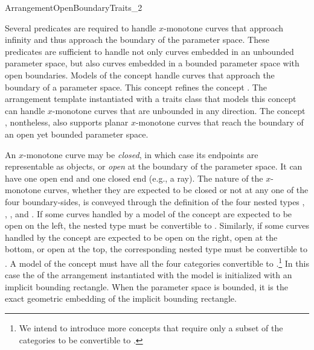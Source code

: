 
\ccRefPageBegin
\begin{ccRefConcept}{ArrangementOpenBoundaryTraits_2}

\ccDefinition
Several predicates are required to handle $x$-monotone curves that
approach infinity and thus approach the boundary of the parameter
space. These predicates are sufficient to handle not only curves
embedded in an unbounded parameter space, but also curves embedded
in a bounded parameter space with open boundaries. Models of the
concept \ccRefName{} handle curves that approach the boundary of a
parameter space. This concept refines the concept
. The arrangement template
instantiated with a traits class that models this concept can handle
$x$-monotone curves that are unbounded in any direction. The concept
\ccRefName{}, nontheless, also supports planar $x$-monotone curves
that reach the boundary of an open yet bounded parameter space.

An $x$-monotone curve may be \emph{closed}, in which case its endpoints
are representable as  objects, or \emph{open} at the
boundary of the parameter space. It can have one open end and one
closed end (e.g., a ray). The nature of the $x$-monotone curves,
whether they are expected to be closed or not at any one of the four
boundary-sides, is conveyed through the definition of the four nested
types , ,
, and . If some curves
handled by a model of the concept \ccRefName{} are expected to be open
on the left, the nested type  must be convertible
to . Similarly, if some curves handled by the
concept are expected to be open on the right, open at the bottom, or
open at the top, the corresponding nested type must be convertible to
. A model of the concept \ccRefName{} must have
all the four categories convertible to
.\footnote{We intend to introduce more concepts
that require only a subset of the categories to be convertible to
.} In this case the \dcel{} of the arrangement
instantiated with the model is initialized with an implicit bounding
rectangle. When the parameter space is bounded, it is the exact
geometric embedding of the implicit bounding rectangle.



\end{ccRefConcept}
